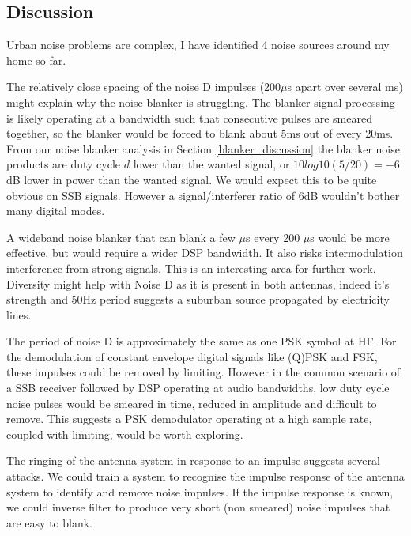 \documentclass{article}
\begin{document}
\subsection{Discussion}

Urban noise problems are complex, I have identified 4 noise sources around my home so far.

The relatively close spacing of the noise D impulses (200$\mu$s apart over several ms) might explain why the noise blanker is struggling.  The blanker signal processing is likely operating at a bandwidth such that consecutive pulses are smeared together, so the blanker would be forced to blank about 5ms out of every 20ms. From our noise blanker analysis in Section \ref{blanker_discussion} the blanker noise products are duty cycle $d$ lower than the wanted signal, or $10log10(5/20)=-6$ dB lower in power than the wanted signal.  We would expect this to be quite obvious on SSB signals.  However a signal/interferer ratio of 6dB wouldn't bother many digital modes.

A wideband noise blanker that can blank a few $\mu$s every 200 $\mu$s would be more effective, but would require a wider DSP bandwidth.  It also risks intermodulation interference from strong signals.  This is an interesting area for further work.  Diversity might help with Noise D as it is present in both antennas, indeed it's strength and 50Hz period suggests a suburban source propagated by electricity lines.

The period of noise D is approximately the same as one PSK symbol at HF.  For the demodulation of constant envelope digital signals like (Q)PSK and FSK, these impulses could be removed by limiting.  However in the common scenario of a SSB receiver followed by DSP operating at audio bandwidths, low duty cycle noise pulses would be smeared in time, reduced in amplitude and difficult to remove.  This suggests a PSK demodulator operating at a high sample rate, coupled with limiting, would be worth exploring.

The ringing of the antenna system in response to an impulse suggests several attacks. We could train a system to recognise the impulse response of the antenna system to identify and remove noise impulses.  If the impulse response is known, we could inverse filter to produce very short (non smeared) noise impulses that are easy to blank.



\end{document}
